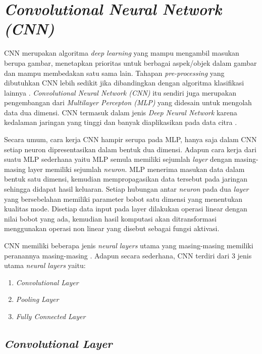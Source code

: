 \section{\textit{Convolutional Neural Network (CNN)}}
\label{sec:convolutionalneuralnetwork}
CNN merupakan algoritma \textit{deep learning} yang mampu mengambil masukan berupa gambar, menetapkan prioritas untuk berbagai aspek/objek dalam gambar dan mampu membedakan satu sama lain. Tahapan \textit{pre-processing} yang dibutuhkan CNN lebih sedikit jika dibandingkan dengan algoritma klasifikasi lainnya \citep*{towardsDS}. \textit{Convolutional Neural Network (CNN)} itu sendiri juga merupakan pengembangan dari \textit{Multilayer Percepton (MLP)} yang didesain untuk mengolah data dua dimensi. CNN termasuk dalam jenis \textit{Deep Neural Network} karena kedalaman jaringan yang tinggi dan banyak diaplikasikan pada data citra \citep*{putra2016klasifikasi}.\par

Secara umum, cara kerja CNN hampir serupa pada MLP, hanya saja dalam CNN setiap neuron dipresentasikan dalam bentuk dua dimensi. Adapun cara kerja dari suatu MLP sederhana yaitu MLP semula memiliki sejumlah \textit{layer} dengan masing-masing layer memiliki sejumlah \textit{neuron}. MLP menerima masukan data dalam bentuk satu dimensi, kemudian mempropagasikan data tersebut pada jaringan sehingga didapat hasil keluaran. Setiap hubungan antar \textit{neuron} pada dua \textit{layer} yang bersebelahan memiliki parameter bobot satu dimensi yang menentukan kualitas mode. Disetiap data input pada layer dilakukan operasi linear dengan nilai bobot yang ada, kemudian hasil komputasi akan ditransformasi menggunakan operasi non linear yang disebut sebagai fungsi aktivasi. \par

CNN memiliki beberapa jenis \textit{neural layers} utama yang masing-masing memiliki peranannya masing-masing \citep*{voulodimos2018deep}. Adapun secara sederhana, CNN terdiri dari 3 jenis utama \textit{neural layers} yaitu: \par
\begin{enumerate}[nolistsep]
    \item \textit{Convolutional Layer}
    \item \textit{Pooling Layer}
    \item \textit{Fully Connected Layer}
\end{enumerate}
\par

\subsection{\textit{Convolutional Layer}}
\label{subsec:convlayer}

